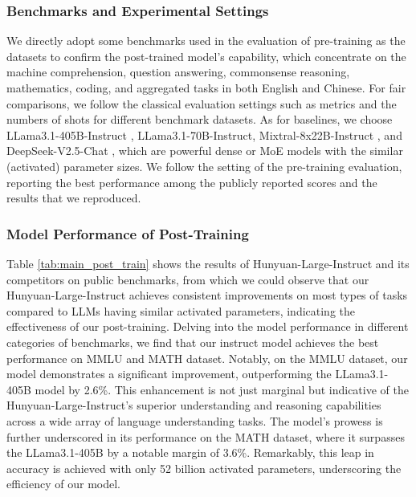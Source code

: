 \documentclass{article}
\begin{document}
\subsubsection{Benchmarks and Experimental Settings}

We directly adopt some benchmarks used in the evaluation of pre-training as the datasets to confirm the post-trained model's capability, which concentrate on the machine comprehension, question answering, commonsense reasoning, mathematics, coding, and aggregated tasks in both English and Chinese.
For fair comparisons, we follow the classical evaluation settings such as metrics and the numbers of shots for different benchmark datasets. As for baselines, we choose LLama3.1-405B-Instruct \citep{dubey2024llama}, LLama3.1-70B-Instruct, Mixtral-8x22B-Instruct \citep{mistral2024mixtral8x22}, and DeepSeek-V2.5-Chat \citep{deepseek2024v2}, which are powerful dense or MoE models with the similar (activated) parameter sizes. We follow the setting of the pre-training evaluation, reporting the best performance among the publicly reported scores and the results that we reproduced.

\subsubsection{Model Performance of Post-Training}
Table \ref{tab:main_post_train} shows the results of Hunyuan-Large-Instruct and its competitors on public benchmarks, from which we could observe that our Hunyuan-Large-Instruct achieves consistent improvements on most types of tasks compared to LLMs having similar activated parameters, indicating the effectiveness of our post-training. Delving into the model performance in different categories of benchmarks, we find that our instruct model achieves the best performance on MMLU and MATH dataset. Notably, on the MMLU dataset, our model demonstrates a significant improvement, outperforming the LLama3.1-405B model by 2.6\%. This enhancement is not just marginal but indicative of the Hunyuan-Large-Instruct's superior understanding and reasoning capabilities across a wide array of language understanding tasks. 
The model's prowess is further underscored in its performance on the MATH dataset, where it surpasses the LLama3.1-405B by a notable margin of 3.6\%. Remarkably, this leap in accuracy is achieved with only 52 billion activated parameters, underscoring the efficiency of our model.
\end{document}
